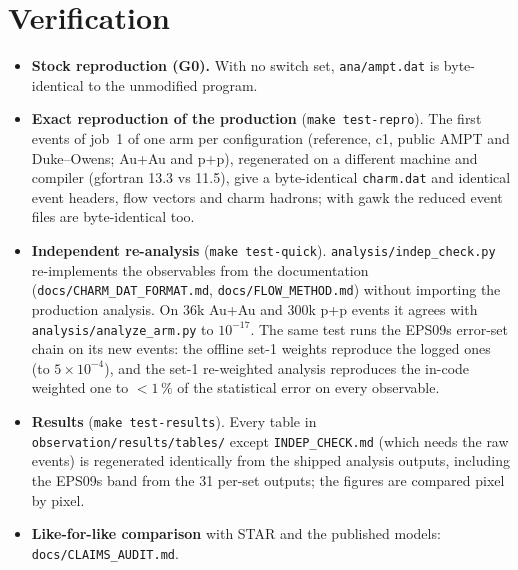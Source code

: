 \documentclass[11pt,a4paper]{article}
\newcommand{\code}[1]{\texttt{#1}}
\begin{document}
\section{Verification}\label{sec:verify}
\begin{itemize}
\item \textbf{Stock reproduction (G0).} With no switch set, \code{ana/ampt.dat} is byte-identical to the unmodified
  program.
\item \textbf{Exact reproduction of the production} (\code{make test-repro}). The first events of job~1 of one arm
  per configuration (reference, c1, public AMPT and Duke--Owens; Au+Au and p+p), regenerated on a different machine
  and compiler (gfortran 13.3 vs 11.5), give a byte-identical \code{charm.dat} and identical event headers, flow
  vectors and charm hadrons; with gawk the reduced event files are byte-identical too.
\item \textbf{Independent re-analysis} (\code{make test-quick}). \code{analysis/indep\_check.py} re-implements the
  observables from the documentation (\code{docs/CHARM\_DAT\_FORMAT.md}, \code{docs/FLOW\_METHOD.md}) without
  importing the production analysis. On 36k Au+Au and 300k p+p events it agrees with \code{analysis/analyze\_arm.py}
  to $10^{-17}$. The same test runs the EPS09s error-set chain on its new events: the offline set-1 weights reproduce
  the logged ones (to $5\times10^{-4}$), and the set-1 re-weighted analysis reproduces the in-code weighted one to
  $<1\,\%$ of the statistical error on every observable.
\item \textbf{Results} (\code{make test-results}). Every table in \code{observation/results/tables/} except
  \code{INDEP\_CHECK.md} (which needs the raw events) is regenerated identically from the shipped
  analysis outputs, including the EPS09s band from the 31 per-set outputs; the figures are compared pixel by pixel.
\item \textbf{Like-for-like comparison} with STAR and the published models: \code{docs/CLAIMS\_AUDIT.md}.
\end{itemize}
\end{document}
